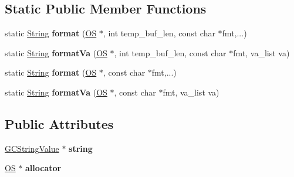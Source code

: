 \subsection*{Static Public Member Functions}
\begin{DoxyCompactItemize}
\item 
static \hyperlink{class_object_script_1_1_o_s_1_1_core_1_1_string}{String} {\bfseries format} (\hyperlink{class_object_script_1_1_o_s}{OS} $\ast$, int temp\+\_\+buf\+\_\+len, const char $\ast$fmt,...)\hypertarget{class_object_script_1_1_o_s_1_1_core_1_1_string_ad63f42f0a4b9b7b2df4ac1d28f452a8e}{}\label{class_object_script_1_1_o_s_1_1_core_1_1_string_ad63f42f0a4b9b7b2df4ac1d28f452a8e}

\item 
static \hyperlink{class_object_script_1_1_o_s_1_1_core_1_1_string}{String} {\bfseries format\+Va} (\hyperlink{class_object_script_1_1_o_s}{OS} $\ast$, int temp\+\_\+buf\+\_\+len, const char $\ast$fmt, va\+\_\+list va)\hypertarget{class_object_script_1_1_o_s_1_1_core_1_1_string_aef2a469716ea8f9944209cb41754c771}{}\label{class_object_script_1_1_o_s_1_1_core_1_1_string_aef2a469716ea8f9944209cb41754c771}

\item 
static \hyperlink{class_object_script_1_1_o_s_1_1_core_1_1_string}{String} {\bfseries format} (\hyperlink{class_object_script_1_1_o_s}{OS} $\ast$, const char $\ast$fmt,...)\hypertarget{class_object_script_1_1_o_s_1_1_core_1_1_string_a9ebf580fdd3a317c18731f4d2cc00e4c}{}\label{class_object_script_1_1_o_s_1_1_core_1_1_string_a9ebf580fdd3a317c18731f4d2cc00e4c}

\item 
static \hyperlink{class_object_script_1_1_o_s_1_1_core_1_1_string}{String} {\bfseries format\+Va} (\hyperlink{class_object_script_1_1_o_s}{OS} $\ast$, const char $\ast$fmt, va\+\_\+list va)\hypertarget{class_object_script_1_1_o_s_1_1_core_1_1_string_aabacb716093c591bb3d9a8336dc3b7cd}{}\label{class_object_script_1_1_o_s_1_1_core_1_1_string_aabacb716093c591bb3d9a8336dc3b7cd}

\end{DoxyCompactItemize}
\subsection*{Public Attributes}
\begin{DoxyCompactItemize}
\item 
\hyperlink{struct_object_script_1_1_o_s_1_1_core_1_1_g_c_string_value}{G\+C\+String\+Value} $\ast$ {\bfseries string}\hypertarget{class_object_script_1_1_o_s_1_1_core_1_1_string_a5b76b28bd1667aec910827bf64ae3755}{}\label{class_object_script_1_1_o_s_1_1_core_1_1_string_a5b76b28bd1667aec910827bf64ae3755}

\item 
\hyperlink{class_object_script_1_1_o_s}{OS} $\ast$ {\bfseries allocator}\hypertarget{class_object_script_1_1_o_s_1_1_core_1_1_string_a7fd3f230c0f67d7175724f7b847468df}{}\label{class_object_script_1_1_o_s_1_1_core_1_1_string_a7fd3f230c0f67d7175724f7b847468df}

\end{DoxyCompactItemize}


